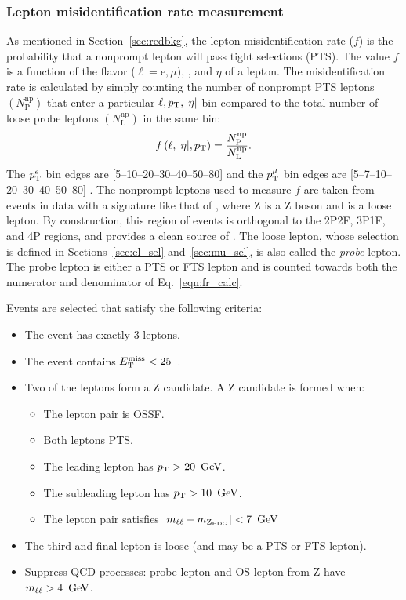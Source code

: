 \subsubsection{Lepton misidentification rate measurement}
\label{sec:fr_evtsel}
As mentioned in Section~\ref{sec:redbkg}, the lepton misidentification rate ($f$) is the probability that a nonprompt lepton will pass tight selections (PTS).
The value $f$ is a function of the flavor ($\ell = \text{e}, \mu$), \pt, and $\eta$ of a lepton.
The misidentification rate is calculated by simply counting the number of nonprompt PTS leptons $\left( N^{\mathrm{np}}_{\mathrm{P}} \right)$ that enter a particular $\ell, p_{\mathrm{T}}, \lvert \eta \rvert$ bin compared to the total number of loose probe leptons $\left( N^{\mathrm{np}}_{\mathrm{L}} \right)$ in the same bin:
\begin{equation}
	\label{eqn:fr_calc}
	f\left( \ell, \lvert \eta \rvert, p_{\mathrm{T}} \right) = 
	\frac{
		N^{\mathrm{np}}_{\mathrm{P}}
		}{
		N^{\mathrm{np}}_{\mathrm{L}}
		}.
\end{equation}
The $p_{\mathrm{T}}^e$ bin edges are [5--10--20--30--40--50--80] \GeV and the $p_{\mathrm{T}}^{\mu}$ bin edges are [5--7--10--20--30--40--50--80] \GeV.
The nonprompt leptons used to measure $f$ are taken from events in data with a signature like that of \ZplusL, where Z is a Z boson and \looselep is a loose lepton.
By construction, this region of events is orthogonal to the 2P2F, 3P1F, and 4P regions, and provides a clean source of \looselep.
The loose lepton, whose selection is defined in Sections~\ref{sec:el_sel} and~\ref{sec:mu_sel}, is also called the \emph{probe} lepton.
The probe lepton is either a PTS or FTS lepton and is counted towards both the numerator and denominator of Eq.~\ref{eqn:fr_calc}. 

Events are selected that satisfy the following criteria:
\begin{itemize}
	\item The event has exactly 3 leptons.
	\item The event contains $E_{\mathrm{T}}^{\text{miss}} < 25$~\GeV.
	\item Two of the leptons form a Z candidate. A Z candidate is formed when:
	\begin{itemize}
		\item The lepton pair is OSSF.
		\item Both leptons PTS.
		\item The leading lepton has $p_{\mathrm{T}} > 20~\,\text{Ge\hspace{-.08em}V}$.
		\item The subleading lepton has $p_{\mathrm{T}} > 10~\,\text{Ge\hspace{-.08em}V}$.
		\item The lepton pair satisfies $\left| m_{\ell\ell} - m_{\mathrm{Z}_{\text{PDG}}} \right| < 7~\,\text{Ge\hspace{-.08em}V}$
	\end{itemize}
	\item The third and final lepton is loose (and may be a PTS or FTS lepton).
	\item Suppress QCD processes: probe lepton and OS lepton from Z have $m_{\ell\ell} > 4~\,\text{Ge\hspace{-.08em}V}$.
\end{itemize}

